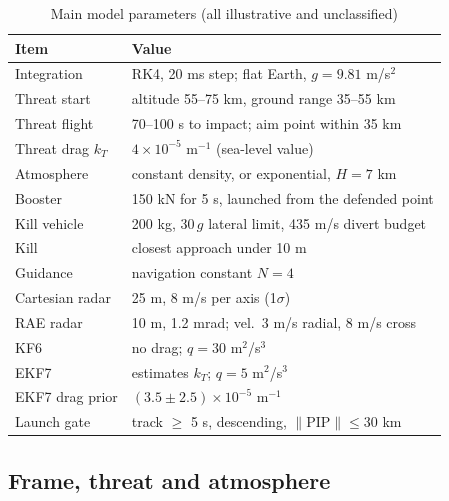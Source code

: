 \documentclass[conference,letterpaper]{IEEEtran}
\begin{document}
\begin{table}[t]
\centering
\caption{Main model parameters (all illustrative and unclassified)}
\label{tab:params}
\footnotesize
\setlength{\tabcolsep}{4pt}
\begin{tabular}{@{}ll@{}}
\toprule
Item & Value \\
\midrule
Integration & RK4, 20 ms step; flat Earth, $g = 9.81$ m/s$^2$ \\
Threat start & altitude 55--75 km, ground range 35--55 km \\
Threat flight & 70--100 s to impact; aim point within 35 km \\
Threat drag $k_T$ & $4\times10^{-5}$ m$^{-1}$ (sea-level value) \\
Atmosphere & constant density, or exponential, $H = 7$ km \\
Booster & 150 kN for 5 s, launched from the defended point \\
Kill vehicle & 200 kg, 30\,$g$ lateral limit, 435 m/s divert budget \\
Kill & closest approach under 10 m \\
Guidance & navigation constant $N = 4$ \\
Cartesian radar & 25 m, 8 m/s per axis (1$\sigma$) \\
RAE radar & 10 m, 1.2 mrad; vel.\ 3 m/s radial, 8 m/s cross \\
KF6 & no drag; $q = 30$ m$^2$/s$^3$ \\
EKF7 & estimates $k_T$; $q = 5$ m$^2$/s$^3$ \\
EKF7 drag prior & $(3.5\pm2.5)\times10^{-5}$ m$^{-1}$ \\
Launch gate & track $\ge$ 5 s, descending, $\lVert$PIP$\rVert \le 30$ km \\
\bottomrule
\end{tabular}
\end{table}

\subsection{Frame, threat and atmosphere}
\end{document}
